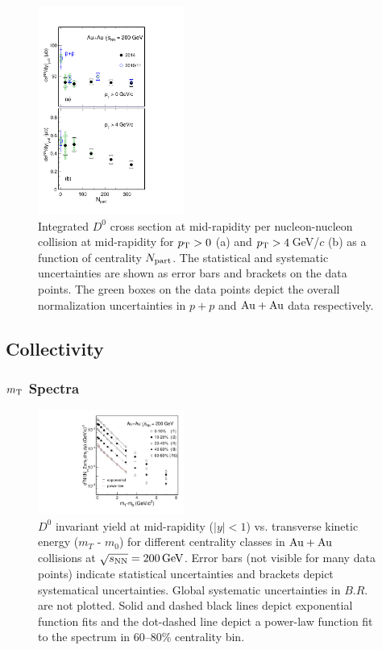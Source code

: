 \documentclass[%
 reprint,	
 amsmath,amssymb,
 aps,
 prc,
]{revtex4-1}
\begin{document}
\begin{figure}
\centering
\includegraphics[width=0.43\textwidth]{fig/Xsection_D0.pdf}
  \caption{Integrated $D^{0}$ cross section at mid-rapidity per nucleon-nucleon collision at mid-rapidity for $p_{\rm T}>0$ (a) and $p_{\rm T}>4$\,GeV/$c$ (b) as a function of centrality $N_{\rm part}$. The statistical and systematic uncertainties are shown as error bars and brackets on the data points. The green boxes on the data points depict the overall normalization uncertainties in $p + p$ and ${\rm{Au + Au}}$ data respectively.}
\label{fig:Xsection_D0} 
\end{figure}

\subsection{\label{result:collectivity}Collectivity}

\subsubsection{\label{result:collectivity:mT}$m_{\rm T}$ Spectra}

\begin{figure}
\centering
\includegraphics[width=0.43\textwidth]{fig/mTFit_D0.pdf}
\caption{$D^{0}$ invariant yield at mid-rapidity ($|y|<1$) vs. transverse kinetic energy ($m_{T}$ - $m_{0}$) for different centrality classes in ${\rm{Au + Au}}$ collisions at ${\sqrt{s_{\rm NN}} = \rm{200\,GeV}}$. Error bars (not visible for many data points) indicate statistical uncertainties and brackets depict systematical uncertainties. Global systematic uncertainties in $B.R.$ are not plotted. Solid and dashed black lines depict exponential function fits and the dot-dashed line depict a power-law function fit to the spectrum in 60--80\% centrality bin.}
\label{fig:mTFit_D0} 
\end{figure}
\end{document}
